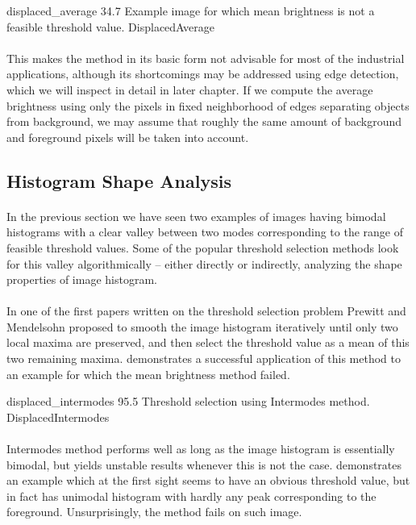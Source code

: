 \thresholdFigure
{displaced_average}
{34.7}
{Example image for which mean brightness is not a feasible threshold value.}
{DisplacedAverage}

\paragraph*{}
This makes the method in its basic form not advisable for most of the industrial applications, although its shortcomings may be addressed using edge detection, which we will inspect in detail in later chapter. If we compute the average brightness using only the pixels in fixed neighborhood of edges separating objects from background, we may assume that roughly the same amount of background and foreground pixels will be taken into account.


\subsection{Histogram Shape Analysis}

\paragraph*{}
In the previous section we have seen two examples of images having bimodal histograms with a clear valley between two modes corresponding to the range of feasible threshold values. Some of the popular threshold selection methods look for this valley algorithmically -- either directly or indirectly, analyzing the shape properties of image histogram. 

\paragraph*{}
In one of the first papers\cite{PrewittMendelsohn66} written on the threshold selection problem Prewitt and Mendelsohn proposed to smooth the image histogram iteratively until only two local maxima are preserved, and then select the threshold value as a mean of this two remaining maxima.  demonstrates a successful application of this method to an example for which the mean brightness method failed.

\thresholdFigure
{displaced_intermodes}
{95.5}
{Threshold selection using Intermodes method.}
{DisplacedIntermodes}

\paragraph*{}
Intermodes method performs well as long as the image histogram is essentially bimodal, but yields unstable results whenever this is not the case.  demonstrates an example which at the first sight seems to have an obvious threshold value, but in fact has unimodal histogram with hardly any peak corresponding to the foreground. Unsurprisingly, the method fails on such image.

